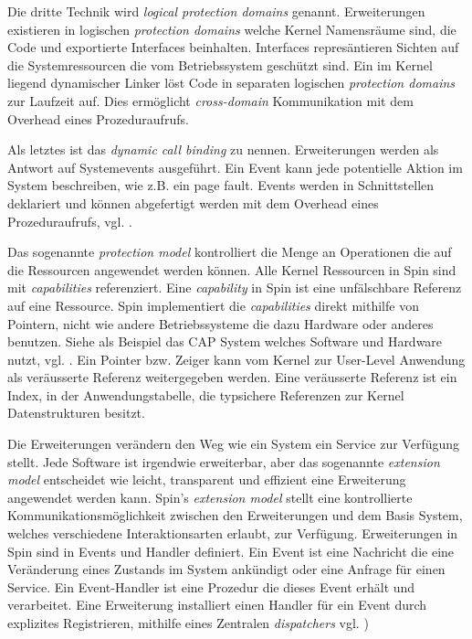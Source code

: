 \documentclass[11pt,technote]{IEEEtran}
\begin{document}
      Die dritte Technik wird \textit{logical protection domains} genannt. Erweiterungen existieren in logischen \textit{protection domains} welche Kernel
      Namensr\"aume sind, die Code und exportierte Interfaces beinhalten. Interfaces repres\"antieren Sichten auf die Systemressourcen
      die vom Betriebssystem gesch\"utzt sind. Ein im Kernel liegend dynamischer Linker l\"ost Code in separaten logischen 
      \textit{protection domains} zur Laufzeit auf. Dies erm\"oglicht \textit{cross-domain} Kommunikation mit dem Overhead eines Prozeduraufrufs.
      
      Als letztes ist das \textit{dynamic call binding} zu nennen. Erweiterungen werden als Antwort auf Systemevents ausgef\"uhrt.
      Ein Event kann jede potentielle Aktion im System beschreiben, wie z.B. ein page fault. Events werden in Schnittstellen deklariert
      und k\"onnen abgefertigt werden mit dem Overhead eines Prozeduraufrufs, vgl. \cite[S. 267 f]{inproc:spin}.
      
      Das sogenannte \textit{protection model} kontrolliert die Menge an Operationen die auf die Ressourcen angewendet werden k\"onnen.
      Alle Kernel Ressourcen in Spin sind mit \textit{capabilities} referenziert. 
      Eine \textit{capability} in Spin ist eine unf\"alschbare Referenz auf eine Ressource.
      Spin implementiert die \textit{capabilities} direkt mithilfe von Pointern, nicht wie andere Betriebssysteme die dazu Hardware oder anderes benutzen.
      Siehe als Beispiel das CAP System welches Software und Hardware nutzt, vgl. \cite{inproc:cap}.
      Ein Pointer bzw. Zeiger kann vom Kernel zur User-Level Anwendung als ver\"ausserte Referenz weitergegeben werden.
      Eine ver\"ausserte Referenz ist ein Index, in der Anwendungstabelle, die typsichere Referenzen zur Kernel Datenstrukturen besitzt.
      
      Die Erweiterungen ver\"andern den Weg wie ein System ein Service zur Verf\"ugung stellt. Jede Software ist irgendwie erweiterbar, 
      aber das sogenannte \textit{extension model} entscheidet wie leicht, transparent und effizient eine Erweiterung angewendet werden kann. 
      Spin's \textit{extension model} stellt eine kontrollierte Kommunikationsm\"oglichkeit zwischen den Erweiterungen und dem Basis System,
      welches verschiedene Interaktionsarten erlaubt, zur Verf\"ugung.
      Erweiterungen in Spin sind in Events und Handler definiert. Ein Event ist eine Nachricht die eine Ver\"anderung eines Zustands im System ank\"undigt
      oder eine Anfrage f\"ur einen Service. Ein Event-Handler ist eine Prozedur die dieses Event erh\"alt und verarbeitet. 
      Eine Erweiterung installiert einen Handler f\"ur ein Event durch explizites Registrieren, mithilfe eines Zentralen
      \textit{dispatchers} vgl. \cite[S. 272]{inproc:spin})
      
\end{document}
